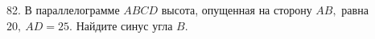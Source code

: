 82. В параллелограмме $ABCD$ высота, опущенная на сторону $AB,$ равна $20,\ AD=25.$ Найдите синус угла $B.$\\
